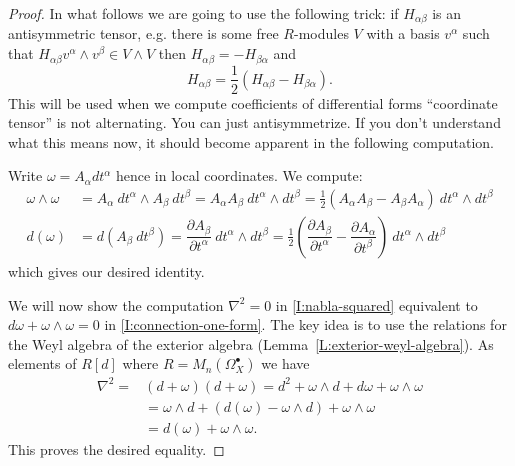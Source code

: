 \documentclass[12pt]{book}
\numberwithin{equation}{section}
\theoremstyle{definition}
\theoremstyle{remark}
\begin{document}
\begin{proof}
	In what follows we are going to use the following trick: if $H_{\alpha\beta}$ is an antisymmetric tensor, e.g. there is some free $R$-modules $V$ with a basis $v^{\alpha}$ such that $H_{\alpha\beta} v^{\alpha}\wedge v^{\beta} \in V\wedge V$ then $H_{\alpha\beta} = -H_{\beta\alpha}$ and 
	$$H_{\alpha\beta} = \frac{1}{2}(H_{\alpha\beta} - H_{\beta\alpha} ).$$
	This will be used when we compute coefficients of differential forms ``coordinate tensor'' is not alternating. 
	You can just antisymmetrize.
	If you don't understand what this means now, it should become apparent in the following computation.
	
	Write $\omega = A_{\alpha} dt^{\alpha}$ hence in local coordinates.
	We compute:
	\begin{align*}
	\omega \wedge \omega &= A_{\alpha} \ dt^{\alpha} \wedge A_{\beta}\ dt^{\beta} 
	= A_{\alpha} A_{\beta} \ dt^{\alpha} \wedge dt^{\beta} =\frac{1}{2} (A_{\alpha} A_{\beta} - A_{\beta} A_{\alpha}) \ dt^{\alpha}\wedge dt^{\beta}\\
	d(\omega) &= d (A_{\beta} \ dt^{\beta}) = \dfrac{\partial A_{\beta}}{\partial t^{\alpha}}\ dt^{\alpha} \wedge dt^{\beta} =  \frac{1}{2}\left(\dfrac{\partial A_{\beta}}{\partial t^{\alpha}}-\dfrac{\partial A_{\alpha}}{\partial t^{\beta}} \right )\ dt^{\alpha}\wedge dt^{\beta} 
	\end{align*}
	which gives our desired identity.
	
	We will now show the computation $\nabla^2=0$ in \eqref{I:nabla-squared} equivalent to $d\omega + \omega\wedge \omega=0$ in \eqref{I:connection-one-form}.
	The key idea is to use the relations for the Weyl algebra of the exterior algebra (Lemma~\ref{L:exterior-weyl-algebra}).
	As elements of $R[d]$ where $R = M_n(\Omega_X^{\bullet})$ we have 
	\begin{align*}
	\nabla^2 =& (d+\omega)(d+\omega) = d^2+\omega\wedge d + d\omega + \omega \wedge \omega \\
	&= \omega \wedge d + (d(\omega) - \omega \wedge d ) + \omega \wedge \omega \\
	&= d(\omega) + \omega \wedge \omega.
	\end{align*}
	This proves the desired equality.
\end{proof}

\end{document}
